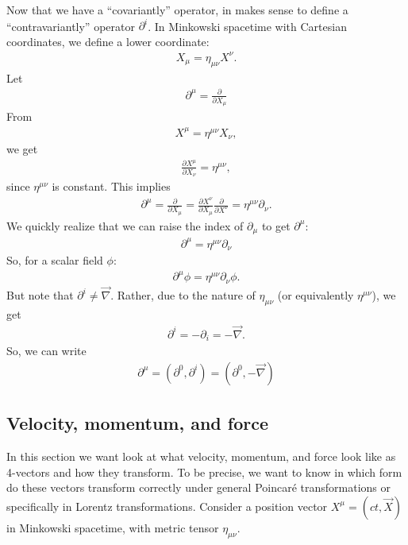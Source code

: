 \documentclass{book}
\theoremstyle{definition}
\begin{document}
Now that we have a ``covariantly'' operator, in makes sense to define a ``contravariantly'' operator $\partial^i$. In Minkowski spacetime with Cartesian coordinates, we define a lower coordinate:
\begin{align*}
X_\mu = \eta_{\mu\nu}X^\nu.
\end{align*}
Let
\begin{align*}
\boxed{\partial^\mu = \frac{\partial }{\partial X_\mu}}
\end{align*}
From
\begin{align*}
X^\mu = \eta^{\mu\nu}X_\nu,
\end{align*}
we get
\begin{align*}
\frac{\partial X^\mu}{\partial X_\nu} = \eta^{\mu\nu},
\end{align*}
since $\eta^{\mu\nu}$ is constant. This implies
\begin{align*}
\partial^\mu = \frac{\partial}{\partial X_\mu} = \frac{\partial X^\nu}{\partial X_\mu}\frac{\partial }{\partial X^\nu} = \eta^{\mu\nu}\partial_\nu.
\end{align*}
We quickly realize that we can raise the index of $\partial_\mu$ to get $\partial^\mu$:
\begin{align*}
\boxed{\partial^\mu = \eta^{\mu\nu}\partial_\nu}
\end{align*}
So, for a scalar field $\phi$:
\begin{align*}
\partial^\mu \phi = \eta^{\mu\nu}\partial_\nu \phi.
\end{align*}
But note that $\partial^i \neq \vec{\nabla}$. Rather, due to the nature of $\eta_{\mu\nu}$ (or equivalently $\eta^{\mu\nu}$), we get
\begin{align*}
\partial^i = -\partial_i = -\vec{\nabla}.
\end{align*}
So, we can write
\begin{align*}
\boxed{\partial^\mu = \left(\partial^0, \partial^i\right) = \left(\partial^0, -\vec{\nabla}\right)}
\end{align*}

\subsection{Velocity, momentum, and force}
In this section we want look at what velocity, momentum, and force look like as 4-vectors and how they transform. To be precise, we want to know in which form do these vectors transform correctly under general Poincar\'e transformations or specifically in Lorentz transformations. Consider a position vector $X^\mu = (ct, \vec{X})$ in Minkowski spacetime, with metric tensor $\eta_{\mu\nu}$.\\
\end{document}
